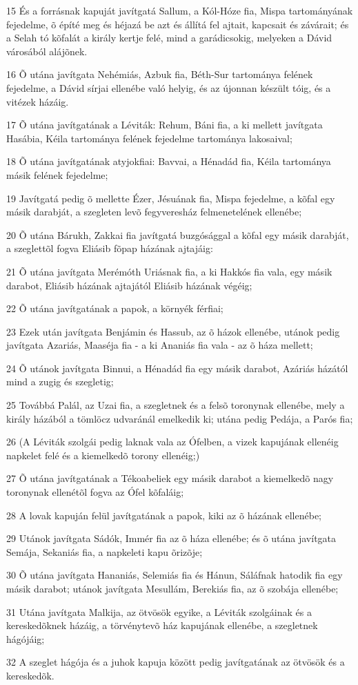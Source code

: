 \par 15 És a forrásnak kapuját javítgatá Sallum, a Kól-Hóze fia, Mispa tartományának fejedelme, õ építé meg és héjazá be azt és állítá fel ajtait, kapcsait és závárait; és a Selah tó kõfalát a király kertje felé, mind a garádicsokig, melyeken a Dávid városából alájõnek.
\par 16 Õ utána javítgata Nehémiás, Azbuk fia, Béth-Sur tartománya felének fejedelme, a Dávid sírjai ellenébe való helyig, és az újonnan készült tóig, és a vitézek házáig.
\par 17 Õ utána javítgatának a Léviták: Rehum, Báni fia, a ki mellett javítgata Hasábia, Kéila tartománya felének fejedelme tartománya lakosaival;
\par 18 Õ utána javítgatának atyjokfiai: Bavvai, a Hénadád fia, Kéila tartománya másik felének fejedelme;
\par 19 Javítgatá pedig õ mellette Ézer, Jésuának fia, Mispa fejedelme, a kõfal egy másik darabját, a szegleten levõ fegyveresház felmenetelének ellenébe;
\par 20 Õ utána Bárukh, Zakkai fia javítgatá buzgósággal a kõfal egy másik darabját, a szeglettõl fogva Eliásib fõpap házának ajtajáig:
\par 21 Õ utána javítgata Merémóth Uriásnak fia, a ki Hakkós fia vala, egy másik darabot, Eliásib házának ajtajától Eliásib házának végéig;
\par 22 Õ utána javítgatának a papok, a környék férfiai;
\par 23 Ezek után javítgata Benjámin és Hassub, az õ házok ellenébe, utánok pedig javítgata Azariás, Maaséja fia - a ki Ananiás fia vala - az õ háza mellett;
\par 24 Õ utánok javítgata Binnui, a Hénadád fia egy másik darabot, Azáriás házától mind a zugig és szegletig;
\par 25 Továbbá Palál, az Uzai fia, a szegletnek és a felsõ toronynak ellenébe, mely a király házából a tömlöcz udvaránál emelkedik ki; utána pedig Pedája, a Parós fia;
\par 26 (A Léviták szolgái pedig laknak vala az Ófelben, a vizek kapujának ellenéig napkelet felé és a kiemelkedõ torony ellenéig;)
\par 27 Õ utána javítgatának a Tékoabeliek egy másik darabot a kiemelkedõ nagy toronynak ellenétõl fogva az Ófel kõfaláig;
\par 28 A lovak kapuján felül javítgatának a papok, kiki az õ házának ellenébe;
\par 29 Utánok javítgata Sádók, Immér fia az õ háza ellenébe; és õ utána javítgata Semája, Sekaniás fia, a napkeleti kapu õrizõje;
\par 30 Õ utána javítgata Hananiás, Selemiás fia és Hánun, Sáláfnak hatodik fia egy másik darabot; utánok javítgata Mesullám, Berekiás fia, az õ szobája ellenébe;
\par 31 Utána javítgata Malkija, az ötvösök egyike, a Léviták szolgáinak és a kereskedõknek házáig, a törvénytevõ ház kapujának ellenébe, a szegletnek hágójáig;
\par 32 A szeglet hágója és a juhok kapuja között pedig javítgatának az ötvösök és a kereskedõk.

